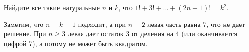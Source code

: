 \problem
Найдите все такие натуральные $n$ и $k$, что
$1! + 3! + \ldots + (2 n - 1)! = k^2$.

\solution
Заметим, что $n = k = 1$ подходит, а при $n = 2$ левая часть равна 7,
что не дает решение.
При $n \geq 3$ левая дает остаток 3 от деления на 4 (или оканчивается цифрой 7),
а потому не может быть квадратом.
\endproblem
